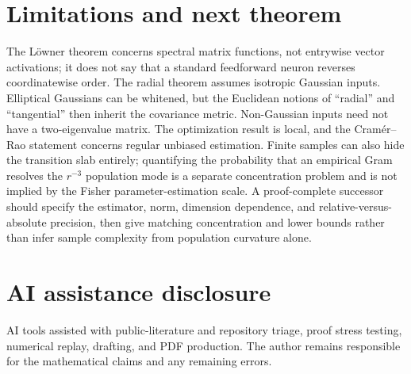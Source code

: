\documentclass[11pt]{article}
\begin{document}
\section{Limitations and next theorem}

The L\"owner theorem concerns spectral matrix functions, not entrywise vector activations; it does not say that a
standard feedforward neuron reverses coordinatewise order.  The radial theorem assumes isotropic Gaussian inputs.
Elliptical Gaussians can be whitened, but the Euclidean notions of
``radial'' and ``tangential'' then inherit the covariance metric.  Non-Gaussian inputs need not have a two-eigenvalue
matrix.  The optimization result is local, and the Cram\'er--Rao statement concerns regular unbiased estimation.
Finite samples can also hide the transition slab entirely; quantifying the probability that an empirical Gram
resolves the $r^{-3}$ population mode is a separate concentration problem and is not implied by the Fisher
parameter-estimation scale.  A proof-complete successor should specify the estimator, norm, dimension dependence,
and relative-versus-absolute precision, then give matching concentration and lower bounds rather than infer sample
complexity from population curvature alone.

\section*{AI assistance disclosure}
AI tools assisted with public-literature and repository triage, proof stress testing, numerical replay, drafting, and
PDF production.  The author remains responsible for the mathematical claims and any remaining errors.
\end{document}
